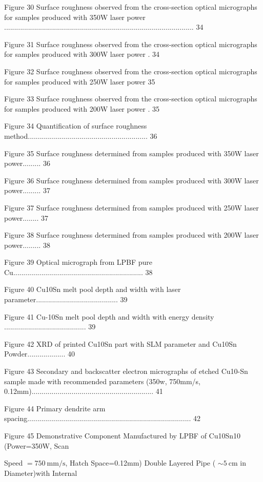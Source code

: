 \documentclass[10pt]{article}
\begin{document}
Figure 30 Surface roughness observed from the cross-section optical micrographs for samples produced with 350W laser power ............................................................................................... 34

Figure 31 Surface roughness observed from the cross-section optical micrographs for samples produced with 300W laser power . 34

Figure 32 Surface roughness observed from the cross-section optical micrographs for samples produced with 250W laser power 35

Figure 33 Surface roughness observed from the cross-section optical micrographs for samples produced with 200W laser power . 35

Figure 34 Quantification of surface roughness method............................................................ 36

Figure 35 Surface roughness determined from samples produced with 350W laser power......... 36

Figure 36 Surface roughness determined from samples produced with 300W laser power......... 37

Figure 37 Surface roughness determined from samples produced with 250W laser power........ 37

Figure 38 Surface roughness determined from samples produced with 200W laser power......... 38

Figure 39 Optical micrograph from LPBF pure Cu................................................................. 38

Figure 40 Cu10Sn melt pool depth and width with laser parameter......................................... 39

Figure 41 Cu-10Sn melt pool depth and width with energy density ......................................... 39

Figure 42 XRD of printed Cu10Sn part with SLM parameter and Cu10Sn Powder................... 40

Figure 43 Secondary and backscatter electron micrographs of etched Cu10-Sn sample made with recommended parameters (350w, 750mm/s, 0.12mm)............................................................. 41

Figure 44 Primary dendrite arm spacing.................................................................................. 42

Figure 45 Demonstrative Component Manufactured by LPBF of Cu10Sn10 (Power=350W, Scan

Speed $=750 \mathrm{~mm} / \mathrm{s}$, Hatch Space=0.12mm) Double Layered Pipe ( $\sim 5 \mathrm{~cm}$ in Diameter)with Internal
\end{document}
